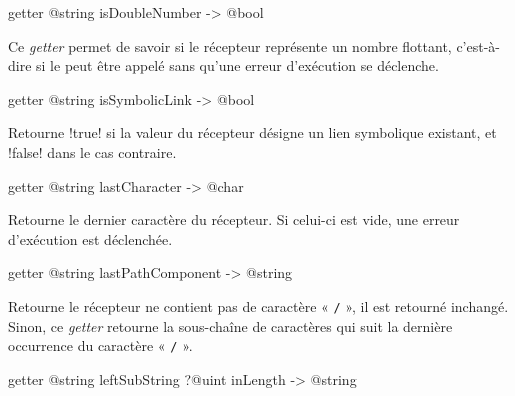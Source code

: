 
\begin{galgasbox}
getter @string isDoubleNumber -> @bool
\end{galgasbox}

Ce \emph{getter} permet de savoir si le récepteur représente un nombre flottant, c'est-à-dire si le  peut être appelé sans qu'une erreur d'exécution se déclenche.








\begin{galgasbox}
getter @string isSymbolicLink -> @bool
\end{galgasbox}

Retourne \ggs!true! si la valeur du récepteur désigne un lien symbolique existant, et \ggs!false! dans le cas contraire.









\begin{galgasbox}
getter @string lastCharacter -> @char
\end{galgasbox}

Retourne le dernier caractère du récepteur. Si celui-ci est vide, une erreur d'exécution est déclenchée.









\begin{galgasbox}
getter @string lastPathComponent -> @string
\end{galgasbox}

Retourne le récepteur ne contient pas de caractère « \texttt{/} », il est retourné inchangé. Sinon, ce \emph{getter} retourne la sous-chaîne de caractères qui suit la dernière occurrence du caractère « \texttt{/} ».









\begin{galgasbox}
getter @string leftSubString ?@uint inLength -> @string
\end{galgasbox}

